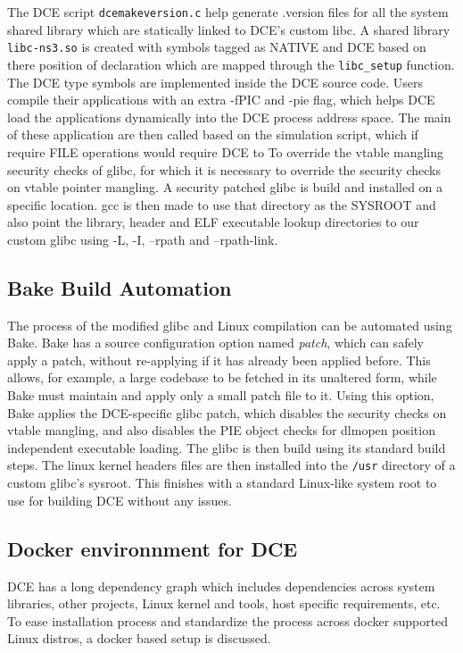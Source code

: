 \documentclass{sig-alternate}
\begin{document}
The DCE script \texttt{dcemakeversion.c} help generate .version files for all the system shared library which are statically linked to DCE's custom libc. A 
shared library \texttt{libc-ns3.so} is created with symbols tagged as NATIVE and DCE based on there position of declaration which are mapped through the 
\texttt{libc\_setup} function. The DCE type symbols are implemented 
inside the DCE source code. Users compile their applications with an extra -fPIC and -pie flag, which helps DCE load the applications dynamically into the DCE process 
address space. The main of these application are then called based on the simulation script, which if require FILE operations would require DCE to To override the vtable 
mangling security checks of glibc, 
for which it is necessary to override the security checks on vtable pointer mangling. A security patched glibc is build and installed on a specific location. gcc is then made 
to use that directory as the SYSROOT and also point the library, header and ELF executable lookup directories to our custom glibc using -L, -I, --rpath and --rpath-link.


\subsection{Bake Build Automation}

The process of the modified glibc and Linux compilation can be automated using Bake.
Bake has a source configuration option named \textit{patch}, which can safely apply a patch, without re-applying if it has already been applied before.  
This allows, for example, a large codebase to be fetched in its unaltered form, while Bake must maintain and apply only a small patch file to it.
Using this option, Bake applies the DCE-specific glibc patch, which disables the security checks on vtable mangling, and also disables the 
PIE object checks for dlmopen position independent executable loading. The glibc is then build using its standard build steps. The linux kernel headers
files are then installed into the \texttt{/usr} directory of a custom glibc's sysroot. This finishes with a standard Linux-like system root to use for building 
DCE without any issues. 


\subsection{Docker environnment for DCE}
DCE has a long dependency graph which includes dependencies across 
system libraries, other projects, Linux kernel and tools, host specific requirements, etc. To ease installation process and standardize the process 
across docker supported Linux distros, a docker based setup is discussed.
\end{document}
